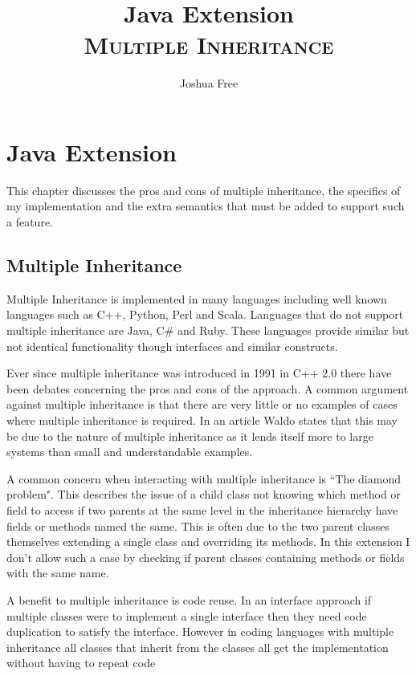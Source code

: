 \documentclass[twocolumn]{article} 	%
\title{Java Extension  \\ \textsc{\small Multiple Inheritance}}
\author{Joshua Free}
\date{}							%
\begin{document}
\maketitle
\section{Java Extension}
This chapter discusses the pros and cons of multiple inheritance, the specifics of my implementation and the extra semantics that must be added to support such a feature.

\subsection{Multiple Inheritance}

Multiple Inheritance is implemented in many languages including well known languages such as C++, Python, Perl and Scala. Languages that do not support multiple inheritance are Java, C\# and Ruby. These languages provide similar but not identical functionality though interfaces and similar constructs.%


Ever since multiple inheritance was introduced in 1991 in C++ 2.0 \cite{date} there have been debates concerning the pros and cons of the approach. A common argument against multiple inheritance is that there are very little or no examples of cases where multiple inheritance is required. In an article Waldo states that this may be due to the nature of multiple inheritance as it lends itself more to large systems than small and understandable examples. \cite{examples}  %


A common concern when interacting with multiple inheritance is ``The diamond problem". This describes the issue of a child class not knowing which method or field to access if two parents at the same level in the inheritance hierarchy have fields or methods named the same. This is often due to the two parent classes themselves extending a single class and overriding its methods. In this extension I don't allow such a case by checking if parent classes containing methods or fields with the same name.


A benefit to multiple inheritance is code reuse. In an interface approach if multiple classes were to implement a single interface then they need code duplication to satisfy the interface. However in coding languages with multiple inheritance all classes that inherit from the classes all get the implementation without having to repeat code
\end{document}
